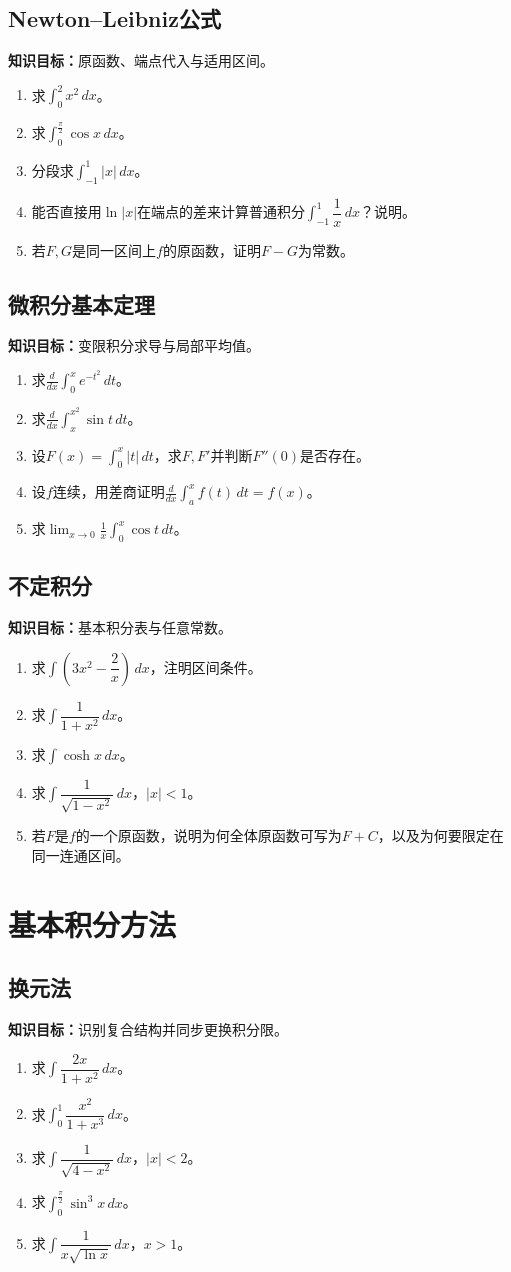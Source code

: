 \documentclass[11pt,a4paper,fontset=fandol]{ctexrep}
\newcommand{\goal}[1]{\textbf{知识目标：}#1\par}
\begin{document}
\subsection{Newton--Leibniz公式}
\goal{原函数、端点代入与适用区间。}
\begin{enumerate}
\item 求$\int_0^2x^2\,dx$。
\item 求$\int_0^{\frac{\pi}{2}}\cos x\,dx$。
\item 分段求$\int_{-1}^1|x|\,dx$。
\item 能否直接用$\ln|x|$在端点的差来计算普通积分$\int_{-1}^1\dfrac{1}{x}\,dx$？说明。
\item 若$F,G$是同一区间上$f$的原函数，证明$F-G$为常数。
\end{enumerate}
\subsection{微积分基本定理}
\goal{变限积分求导与局部平均值。}
\begin{enumerate}
\item 求$\frac{d}{dx}\int_0^x e^{-t^2}\,dt$。
\item 求$\frac{d}{dx}\int_x^{x^2}\sin t\,dt$。
\item 设$F(x)=\int_0^x|t|\,dt$，求$F,F'$并判断$F''(0)$是否存在。
\item 设$f$连续，用差商证明$\frac{d}{dx}\int_a^xf(t)\,dt=f(x)$。
\item 求$\lim_{x\to0}\frac1x\int_0^x\cos t\,dt$。
\end{enumerate}
\subsection{不定积分}
\goal{基本积分表与任意常数。}
\begin{enumerate}
\item 求$\int\left(3x^2-\dfrac{2}{x}\right)\,dx$，注明区间条件。
\item 求$\int\dfrac{1}{1+x^2}\,dx$。
\item 求$\int\cosh x\,dx$。
\item 求$\int\dfrac{1}{\sqrt{1-x^2}}\,dx$，$|x|<1$。
\item 若$F$是$f$的一个原函数，说明为何全体原函数可写为$F+C$，以及为何要限定在同一连通区间。
\end{enumerate}
\section{基本积分方法}
\subsection{换元法}
\goal{识别复合结构并同步更换积分限。}
\begin{enumerate}
\item 求$\int\dfrac{2x}{1+x^2}\,dx$。
\item 求$\int_0^1\dfrac{x^2}{1+x^3}\,dx$。
\item 求$\int\dfrac{1}{\sqrt{4-x^2}}\,dx$，$|x|<2$。
\item 求$\int_0^{\frac{\pi}{2}}\sin^3x\,dx$。
\item 求$\int\dfrac{1}{x\sqrt{\ln x}}\,dx$，$x>1$。
\end{enumerate}
\end{document}
